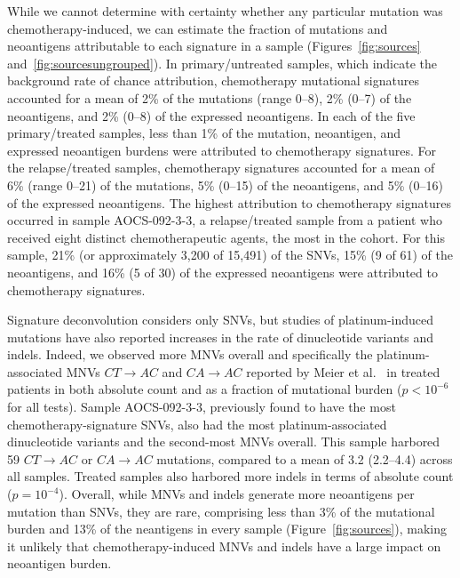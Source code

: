 While we cannot determine with certainty whether any particular mutation was chemotherapy-induced, we can estimate the fraction of mutations and neoantigens attributable to each signature in a sample (Figures~\ref{fig:sources} and~\ref{fig:sourcesungrouped}). In primary/untreated samples, which indicate the background rate of chance attribution, chemotherapy mutational signatures accounted for a mean of 2\% of the mutations (range 0--8), 2\% (0--7) of the neoantigens, and 2\% (0--8) of the expressed neoantigens. In each of the five primary/treated samples, less than 1\% of the mutation, neoantigen, and expressed neoantigen burdens were attributed to chemotherapy signatures. For the relapse/treated samples, chemotherapy signatures accounted for a mean of 6\% (range 0--21) of the mutations, 5\% (0--15) of the neoantigens, and 5\% (0--16) of the expressed neoantigens. The highest attribution to chemotherapy signatures occurred in sample AOCS-092-3-3, a relapse/treated sample from a patient who received eight distinct chemotherapeutic agents, the most in the cohort. For this sample, 21\% (or approximately 3,200 of 15,491) of the SNVs, 15\% (9 of 61) of the neoantigens, and 16\% (5 of 30) of the expressed neoantigens were attributed to chemotherapy signatures.

Signature deconvolution considers only SNVs, but studies of platinum-induced mutations have also reported increases in the rate of dinucleotide variants and indels. Indeed, we observed more MNVs overall and specifically the platinum-associated MNVs $CT \rightarrow AC$ and $CA \rightarrow AC$ reported by Meier et al.~\cite{Meier_2014} in treated patients in both absolute count and as a fraction of mutational burden ($p < 10^{-6}$ for all tests). Sample AOCS-092-3-3, previously found to have the most chemotherapy-signature SNVs, also had the most platinum-associated dinucleotide variants and the second-most MNVs overall. This sample harbored 59 $CT \rightarrow AC$ or $CA \rightarrow AC$ mutations, compared to a mean of 3.2 (2.2--4.4) across all samples. Treated samples also harbored more indels in terms of absolute count ($p=10^{-4}$). Overall, while MNVs and indels generate more neoantigens per mutation than SNVs, they are rare, comprising less than 3\% of the mutational burden and 13\% of the neantigens in every sample (Figure~\ref{fig:sources}), making it unlikely that chemotherapy-induced MNVs and indels have a large impact on neoantigen burden.

